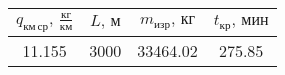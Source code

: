 \begin{tabular}{|c|c|c|c|}
\hline
$q_{км\, ср},\, \frac{кг}{км}$ & $L,\, м$ & $m_{изр},\, кг$ & $t_{кр},\, мин$ \\ 
\hline
11.155 & 3000 & 33464.02 & 275.85 \\ 
\hline
\end{tabular}